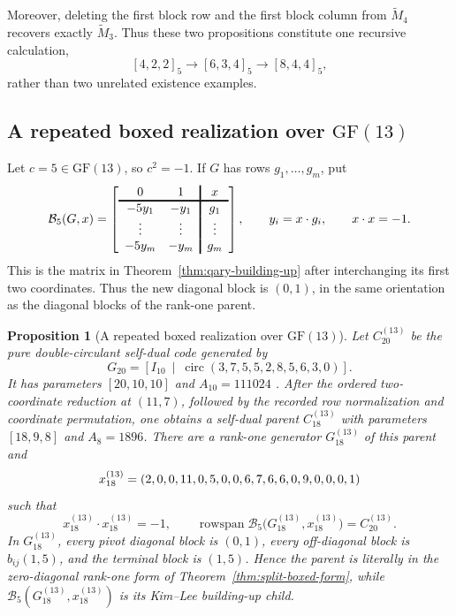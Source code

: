 \documentclass[12pt]{article}
\newtheorem{prop}[theorem]{Proposition}
\newcommand{\GF}[1]{\ensuremath{\mathrm{GF}(#1)}}
\begin{document}
Moreover, deleting the first block row and the first block column from
\(\widetilde M_4\) recovers exactly \(\widetilde M_3\).  Thus these two
propositions constitute one recursive calculation,
\[
[4,2,2]_5\longrightarrow[6,3,4]_5
\longrightarrow[8,4,4]_5,
\]
rather than two unrelated existence examples.

\subsection{A repeated boxed realization over
\texorpdfstring{\(\GF{13}\)}{GF(13)}}

Let \(c=5\in\GF{13}\), so \(c^2=-1\).  If \(G\) has rows
\(g_1,\ldots,g_m\), put
\begin{equation}
\mathcal B_5(G,x)=
\left[
\begin{array}{cc!{\vrule width 1.2pt}c}
0&1&x\\
\noalign{\hrule height 1.2pt}
-5y_1&-y_1&g_1\\
\vdots&\vdots&\vdots\\
-5y_m&-y_m&g_m
\end{array}
\right],
\qquad y_i=x\cdot g_i,\qquad x\cdot x=-1.
\label{eq:gf13-repeated-box}
\end{equation}
This is the matrix in Theorem~\ref{thm:qary-building-up} after interchanging
its first two coordinates.  Thus the new diagonal block is \((0,1)\), in the
same orientation as the diagonal blocks of the rank-one parent.

\begin{prop}[A repeated boxed realization over
\texorpdfstring{\(\GF{13}\)}{GF(13)}]
\label{prop:gf13-repeated-realization}
\rm
Let \(C_{20}^{(13)}\) be the pure double-circulant self-dual code generated
by
\[
G_{20}=\left[I_{10}\ \middle|\
\operatorname{circ}(3,7,5,5,2,8,5,6,3,0)\right].
\]
It has parameters \([20,10,10]\) and \(A_{10}=111024\)
\cite{BetsumiyaEtAl}.  After the ordered two-coordinate reduction at
\((11,7)\), followed by the recorded row normalization and coordinate
permutation, one obtains a self-dual parent \(C_{18}^{(13)}\) with parameters
\([18,9,8]\) and \(A_8=1896\).  There are a rank-one generator
\(G_{18}^{(13)}\) of this parent and
\[
x_{18}^{(13)}=(2,0,0,11,0,5,0,0,6,7,6,6,0,9,0,0,0,1)
\]
such that
\[
x_{18}^{(13)}\cdot x_{18}^{(13)}=-1,\qquad
\operatorname{rowspan}\mathcal B_5
 \bigl(G_{18}^{(13)},x_{18}^{(13)}\bigr)=C_{20}^{(13)}.
\]
In \(G_{18}^{(13)}\), every pivot diagonal block is \((0,1)\), every
off-diagonal block is \(b_{ij}(1,5)\), and the terminal block is \((1,5)\).
Hence the parent is literally in the zero-diagonal rank-one form of
Theorem~\ref{thm:split-boxed-form}, while
\(\mathcal B_5(G_{18}^{(13)},x_{18}^{(13)})\) is its Kim--Lee
building-up child.
\end{prop}
\end{document}
